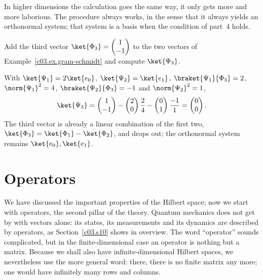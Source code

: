 In higher dimensions the calculation goes the same way, it only gets more and more laborious.
The procedure always works, in the sense that it always yields an orthonormal system; that
system is a basis when the condition of part~4 holds.

\begin{exercise}\label{c03.exc.gram-schmidt}
  Add the third vector $\ket{\Phi_3} = \begin{pmatrix} 1 \\ -1 \end{pmatrix}$ to the two vectors
  of Example~\ref{c03.ex.gram-schmidt} and compute $\ket{\Psi_3}$.
\end{exercise}
\begin{solution}
  With $\ket{\Psi_1} = 2\ket{e_0}$, $\ket{\Psi_2} = \ket{e_1}$, $\braket{\Psi_1}{\Phi_3} = 2$,
  $\norm{\Psi_1}^2 = 4$, $\braket{\Psi_2}{\Phi_3} = -1$ and $\norm{\Psi_2}^2 = 1$,
  \begin{equation}\label{c03.eq.gs-null}
    \ket{\Psi_3} = \begin{pmatrix} 1 \\ -1 \end{pmatrix} - \begin{pmatrix} 2 \\ 0 \end{pmatrix} \frac{2}{4}
    - \begin{pmatrix} 0 \\ 1 \end{pmatrix} \frac{-1}{1} = \begin{pmatrix} 0 \\ 0 \end{pmatrix} .
  \end{equation}
  The third vector is already a linear combination of the first two,
  $\ket{\Phi_3} = \ket{\Phi_1} - \ket{\Phi_2}$, and drops out; the orthonormal system remains
  $\ket{e_0}, \ket{e_1}$.
\end{solution}

\section{Operators}\label{c03.s8}

We have discussed the important properties of the Hilbert space; now we start with operators,
the second pillar of the theory. Quantum mechanics does not get by with vectors alone: its
states, its measurements and its dynamics are described by operators, as
Section~\ref{c03.s10} shows in overview. The word ``operator'' sounds complicated, but in the
finite-dimensional case an operator is nothing but a matrix. Because we shall also have
infinite-dimensional Hilbert spaces, we nevertheless use the more general word: there, there
is no finite matrix any more; one would have infinitely many rows and columns.

